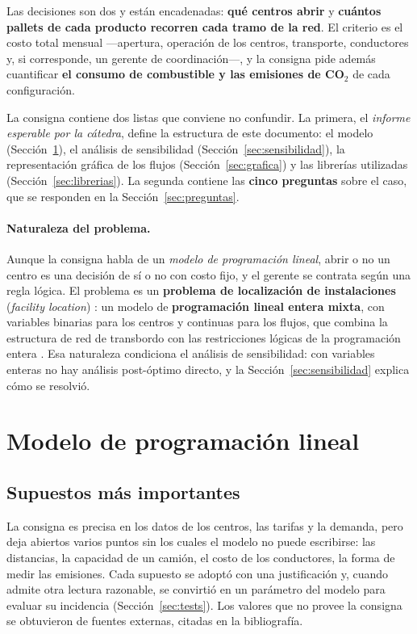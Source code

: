 \documentclass[10pt,a4paper]{article}
\begin{document}
Las decisiones son dos y están encadenadas: \textbf{qué centros abrir} y
\textbf{cuántos pallets de cada producto recorren cada tramo de la red}. El
criterio es el costo total mensual —apertura, operación de los centros,
transporte, conductores y, si corresponde, un gerente de coordinación—, y la
consigna pide además cuantificar \textbf{el consumo de combustible y las
emisiones de CO$_2$} de cada configuración.

La consigna contiene dos listas que conviene no confundir. La primera, el
\emph{informe esperable por la cátedra}, define la estructura de este
documento: el modelo (Sección~\ref{sec:modelo}), el análisis de sensibilidad
(Sección~\ref{sec:sensibilidad}), la representación gráfica de los flujos
(Sección~\ref{sec:grafica}) y las librerías utilizadas
(Sección~\ref{sec:librerias}). La segunda contiene las \textbf{cinco
preguntas} sobre el caso, que se responden en la Sección~\ref{sec:preguntas}.

\paragraph{Naturaleza del problema.} Aunque la consigna habla de un
\emph{modelo de programación lineal}, abrir o no un centro es una decisión de
sí o no con costo fijo, y el gerente se contrata según una regla lógica. El
problema es un \textbf{problema de localización de instalaciones}
(\emph{facility location}) \cite{scipbook}: un modelo de \textbf{programación
lineal entera mixta}, con variables binarias para los centros y continuas para
los flujos, que combina la estructura de red de transbordo \cite{catedra-redes}
con las restricciones lógicas de la programación entera \cite{catedra-mip}.
Esa naturaleza condiciona el análisis de sensibilidad: con variables enteras
no hay análisis post-óptimo directo, y la Sección~\ref{sec:sensibilidad}
explica cómo se resolvió.

\section{Modelo de programación lineal}
\label{sec:modelo}

\subsection{Supuestos más importantes}
\label{sec:supuestos}

La consigna es precisa en los datos de los centros, las tarifas y la demanda,
pero deja abiertos varios puntos sin los cuales el modelo no puede escribirse:
las distancias, la capacidad de un camión, el costo de los conductores, la
forma de medir las emisiones. Cada supuesto se adoptó con una justificación y,
cuando admite otra lectura razonable, se convirtió en un parámetro del modelo
para evaluar su incidencia (Sección~\ref{sec:tests}). Los valores que no
provee la consigna se obtuvieron de fuentes externas, citadas en la
bibliografía.
\end{document}
